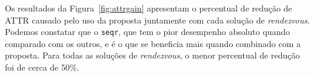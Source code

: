 {%



Os resultados da Figura~\ref{fig:attrgain} apresentam o percentual de redução de ATTR causado pelo uso da proposta juntamente com cada solução de {\it rendezvous}. Podemos constatar que o {\tt seqr}, que tem o pior desempenho absoluto quando comparado com os outros, e é o que se beneficia mais quando combinado com a proposta. Para todas as soluções de {\it rendezvous}, o menor percentual de redução foi de cerca de 50\%. %






}
